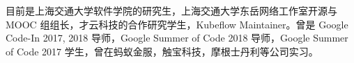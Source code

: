 

\begin{cvparagraph}
\begin{minipage}[t]{\textwidth}
目前是上海交通大学软件学院的研究生，上海交通大学东岳网络工作室开源与 MOOC 组组长，才云科技的合作研究学生，Kubeflow Maintainer。曾是 Google Code-In 2017, 2018 导师，Google Summer of Code 2018 导师，Google Summer of Code 2017 学生，曾在蚂蚁金服，触宝科技，摩根士丹利等公司实习。
\end{minipage}
\end{cvparagraph}
